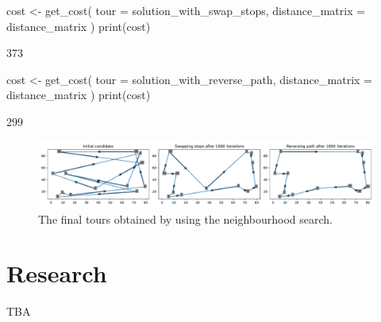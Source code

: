 \begin{Rin}
cost <- get_cost(
    tour = solution_with_swap_stops,
    distance_matrix = distance_matrix
)
print(cost)
\end{Rin}

\begin{Rout}
[1] 373
\end{Rout}

\begin{Rin}
cost <- get_cost(
    tour = solution_with_reverse_path,
    distance_matrix = distance_matrix
)
print(cost)
\end{Rin}

\begin{Rout}
[1] 299
\end{Rout}


\begin{figure}
    \begin{center}
        \includegraphics[width=\textwidth]{./assets/final-tsp-tours-with-R/main.pdf}
    \end{center}
    \caption{The final tours obtained by using the neighbourhood search.}
    \label{fig:final-tsp-tours}
\end{figure}

\section{Research}\label{sec:research}

TBA
